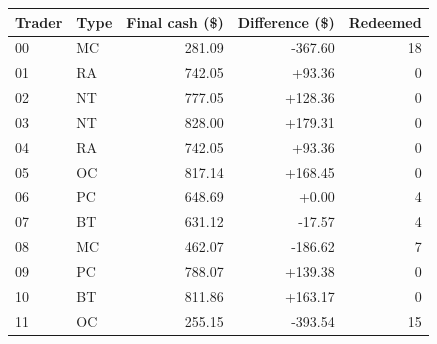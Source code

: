 \begin{center}\small
\begin{tabular}{@{}llrrr@{}}
\toprule
Trader & Type & Final cash (\$) & Difference (\$) & Redeemed \\
\midrule
00 & MC & 281.09 & -367.60 & 18 \\
01 & RA & 742.05 & +93.36 & 0 \\
02 & NT & 777.05 & +128.36 & 0 \\
03 & NT & 828.00 & +179.31 & 0 \\
04 & RA & 742.05 & +93.36 & 0 \\
05 & OC & 817.14 & +168.45 & 0 \\
06 & PC & 648.69 & +0.00 & 4 \\
07 & BT & 631.12 & -17.57 & 4 \\
08 & MC & 462.07 & -186.62 & 7 \\
09 & PC & 788.07 & +139.38 & 0 \\
10 & BT & 811.86 & +163.17 & 0 \\
11 & OC & 255.15 & -393.54 & 15 \\
\bottomrule
\end{tabular}
\end{center}
